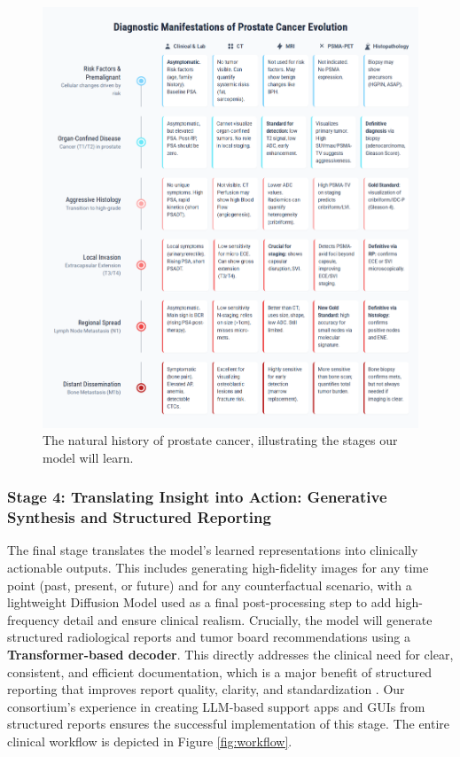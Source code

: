 \documentclass[11pt, a4paper]{article}
\begin{document}
\begin{figure}[H]
    \centering
    \includegraphics[width=\textwidth]{pe.png}
    \caption{The natural history of prostate cancer, illustrating the stages our model will learn.}
    \label{fig:prostate_evolution}
\end{figure}

\subsubsection{Stage 4: Translating Insight into Action: Generative Synthesis and Structured Reporting}
The final stage translates the model's learned representations into clinically actionable outputs. This includes generating high-fidelity images for any time point (past, present, or future) and for any counterfactual scenario, with a lightweight Diffusion Model used as a final post-processing step to add high-frequency detail and ensure clinical realism. Crucially, the model will generate structured radiological reports and tumor board recommendations using a \textbf{Transformer-based decoder}. This directly addresses the clinical need for clear, consistent, and efficient documentation, which is a major benefit of structured reporting that improves report quality, clarity, and standardization \cite{JorgHalfmann2023, SacoranskyKwan2024}. Our consortium's experience in creating LLM-based support apps and GUIs from structured reports ensures the successful implementation of this stage. The entire clinical workflow is depicted in Figure \ref{fig:workflow}.
\end{document}
